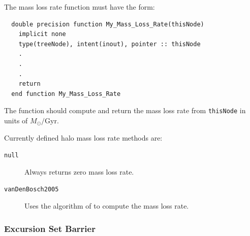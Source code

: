 The mass loss rate function must have the form:
\begin{verbatim}
  double precision function My_Mass_Loss_Rate(thisNode)
    implicit none
    type(treeNode), intent(inout), pointer :: thisNode
    .
    .
    .
    return
  end function My_Mass_Loss_Rate
\end{verbatim}
The function should compute and return the mass loss rate from {\tt thisNode} in units of $M_\odot/$Gyr.

Currently defined halo mass loss rate methods are:
\begin{description}
 \item [{\tt null}] Always returns zero mass loss rate.
 \item [{\tt vanDenBosch2005}] Uses the algorithm of \cite{van_den_bosch_mass_2005} to compute the mass loss rate.
\end{description}

\subsubsection{Excursion Set Barrier}\label{sec:excursionSetBarrierMethod}

